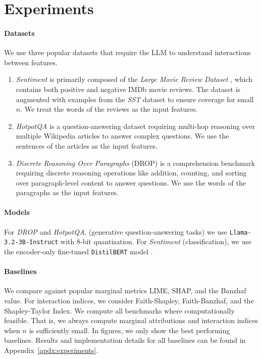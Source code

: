 \section{Experiments}
\label{sec:language}

\paragraph{Datasets} 
We use three popular datasets that require the LLM to understand interactions between features. 
\begin{enumerate}[ topsep=0pt, itemsep=0pt, leftmargin=*]
\item \emph{Sentiment} is primarily composed of the \emph{Large Movie Review Dataset} \cite{maas-EtAl:2011:ACL-HLT2011}, which contains both positive and negative IMDb movie reviews. The dataset is augmented with examples from the \emph{SST} dataset \cite{ socher2013recursive} to ensure coverage for small $n$. We treat the words of the reviews as the input features.
\item{\emph{HotpotQA} \cite{yang2018hotpotqa} is a question-answering dataset requiring multi-hop reasoning over multiple Wikipedia articles to answer complex questions. We use the sentences of the articles as the input features.}
\item{\emph{Discrete Reasoning Over Paragraphs} (DROP)} \cite{dua2019drop} is a comprehension benchmark requiring discrete reasoning operations like addition, counting, and sorting over paragraph-level content to answer questions. We use the words of the paragraphs as the input features. 
\end{enumerate}
%
%
\vspace{-7pt}
\paragraph{Models} For \textit{DROP} and \textit{HotpotQA}, (generative question-answering tasks) we use \texttt{Llama-3.2-3B-Instruct} \cite{grattafiori2024llama3herdmodels} with $8$-bit quantization. For \emph{Sentiment} (classification), we use the encoder-only fine-tuned \texttt{DistilBERT} model \cite{Sanh2019DistilBERTAD,sentimentBert}.
%

\vspace{-7pt}
\paragraph{Baselines} We compare against popular marginal metrics LIME, SHAP, and the Banzhaf value. 
%
For interaction indices, we consider Faith-Shapley, Faith-Banzhaf, and the Shapley-Taylor Index. We compute all benchmarks where computationally feasible. That is, we always compute marginal attributions and interaction indices when $n$ is sufficiently small. In figures, we only show the best performing baselines. Results and implementation details for all baselines can be found in 
Appendix~\ref{apdx:experiments}.

